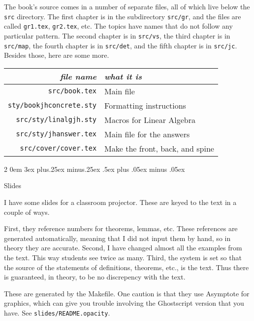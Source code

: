 \documentclass[titlepage]{article}
\makeatletter
\renewcommand{\subsection}{\@startsection{subsection}%
  {2}%
  {0em}%
  {3ex plus.25ex minus.25ex}%
  {.5ex plus .05ex minus .05ex}%
  {\bfseries\raggedright}}
\makeatother
\begin{document}
The book's source comes in a number of separate files, all of 
which live below the \texttt{src} directory.
The first chapter is in the subdirectory \texttt{src/gr}, and the files
are called 
\texttt{gr1.tex}, \texttt{gr2.tex}, etc.
The topics have names that do not follow any particular pattern.
The second chapter is in \texttt{src/vs}, 
the third chapter is in \texttt{src/map},
the fourth chapter is in \texttt{src/det}, 
and the fifth chapter is in
\texttt{src/jc}.
Besides those, here are some more.
\begin{center}
  \begin{tabular}{r|l}
    \textit{file name}  &\textit{what it is}  \\
    \hline
    \texttt{src/book.tex}     &Main file \\
    \texttt{sty/bookjhconcrete.sty}   &Formatting instructions  \\
    \texttt{src/sty/linalgjh.sty} &Macros for Linear Algebra \\
    \texttt{src/sty/jhanswer.tex} &Main file for the answers \\
    \texttt{src/cover/cover.tex} &Make the front, back, and spine \\
  \end{tabular}
\end{center}





\subsection{Slides}

I have some slides for a classroom projector.
These are keyed to the text in a couple of ways.

First, they reference numbers for theorems, lemmas, etc.
These references are generated automatically, meaning that I did not input
them by hand, so in theory they are accurate.
Second, I have changed almost all the examples from the text.
This way students see twice as many.
Third, the system is set so that the source of the statements of
definitions, theorems, etc., is the text.
Thus there is guaranteed, in theory, to be no discrepency with the 
text. 

These are generated by the Makefile.
One caution is that they use Asymptote for graphics, which can 
give you trouble involving the Ghostscript version that you have.
See \texttt{slides/README.opacity}.
\end{document}
